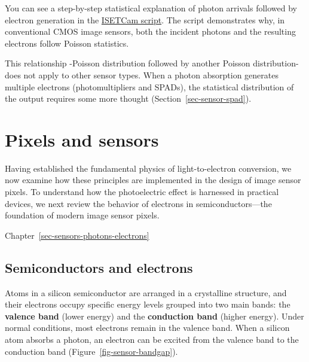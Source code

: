 \documentclass[
  letterpaper,
]{book}
\begin{document}
\begin{tcolorbox}[enhanced jigsaw, titlerule=0mm, colback=white, left=2mm, colframe=quarto-callout-note-color-frame, breakable, rightrule=.15mm, bottomtitle=1mm, title=\textcolor{quarto-callout-note-color}{\faInfo}\hspace{0.5em}{ISETCam: shot noise}, opacitybacktitle=0.6, toprule=.15mm, colbacktitle=quarto-callout-note-color!10!white, toptitle=1mm, coltitle=black, arc=.35mm, leftrule=.75mm, opacityback=0, bottomrule=.15mm]

You can see a step-by-step statistical explanation of photon arrivals
followed by electron generation in the
\href{../code/fise_photonsElectrons.html}{ISETCam script}. The script
demonstrates why, in conventional CMOS image sensors, both the incident
photons and the resulting electrons follow Poisson statistics.

This relationship -Poisson distribution followed by another Poisson
distribution- does not apply to other sensor types. When a photon
absorption generates multiple electrons (photomultipliers and SPADs),
the statistical distribution of the output requires some more thought
(Section~\ref{sec-sensor-spad}).

\end{tcolorbox}

\chapter{Pixels and sensors}\label{sec-pixels}

Having established the fundamental physics of light-to-electron
conversion, we now examine how these principles are implemented in the
design of image sensor pixels. To understand how the photoelectric
effect is harnessed in practical devices, we next review the behavior of
electrons in semiconductors---the foundation of modern image sensor
pixels.

Chapter~\ref{sec-sensors-photons-electrons}

\section{Semiconductors and electrons}\label{sec-semiconductor-physics}

Atoms in a silicon semiconductor are arranged in a crystalline
structure, and their electrons occupy specific energy levels grouped
into two main bands: the \textbf{valence band} (lower energy) and the
\textbf{conduction band} (higher energy). Under normal conditions, most
electrons remain in the valence band. When a silicon atom absorbs a
photon, an electron can be excited from the valence band to the
conduction band (Figure~\ref{fig-sensor-bandgap}).
\end{document}
